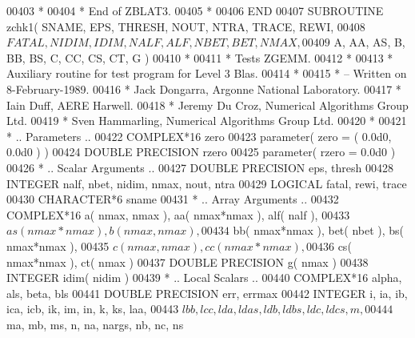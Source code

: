 \begin{DoxyCode}
00403 \textcolor{comment}{*}
00404 \textcolor{comment}{*     End of ZBLAT3.}
00405 \textcolor{comment}{*}
00406 \textcolor{keyword}{      END}
00407 \textcolor{keyword}{      SUBROUTINE }zchk1( SNAME, EPS, THRESH, NOUT, NTRA, TRACE, REWI,
00408      $                  FATAL, NIDIM, IDIM, NALF, ALF, NBET, BET, NMAX,
00409      $                  A, AA, AS, B, BB, BS, C, CC, CS, CT, G )
00410 \textcolor{comment}{*}
00411 \textcolor{comment}{*  Tests ZGEMM.}
00412 \textcolor{comment}{*}
00413 \textcolor{comment}{*  Auxiliary routine for test program for Level 3 Blas.}
00414 \textcolor{comment}{*}
00415 \textcolor{comment}{*  -- Written on 8-February-1989.}
00416 \textcolor{comment}{*     Jack Dongarra, Argonne National Laboratory.}
00417 \textcolor{comment}{*     Iain Duff, AERE Harwell.}
00418 \textcolor{comment}{*     Jeremy Du Croz, Numerical Algorithms Group Ltd.}
00419 \textcolor{comment}{*     Sven Hammarling, Numerical Algorithms Group Ltd.}
00420 \textcolor{comment}{*}
00421 \textcolor{comment}{*     .. Parameters ..}
00422       \textcolor{keywordtype}{COMPLEX*16}         zero
00423       parameter( zero = ( 0.0d0, 0.0d0 ) )
00424       \textcolor{keywordtype}{DOUBLE PRECISION}   rzero
00425       parameter( rzero = 0.0d0 )
00426 \textcolor{comment}{*     .. Scalar Arguments ..}
00427       \textcolor{keywordtype}{DOUBLE PRECISION}   eps, thresh
00428       \textcolor{keywordtype}{INTEGER}            nalf, nbet, nidim, nmax, nout, ntra
00429       \textcolor{keywordtype}{LOGICAL}            fatal, rewi, trace
00430       \textcolor{keywordtype}{CHARACTER*6}        sname
00431 \textcolor{comment}{*     .. Array Arguments ..}
00432       \textcolor{keywordtype}{COMPLEX*16}         a( nmax, nmax ), aa( nmax*nmax ), alf( nalf ),
00433      $                   as( nmax*nmax ), b( nmax, nmax ),
00434      $                   bb( nmax*nmax ), bet( nbet ), bs( nmax*nmax ),
00435      $                   c( nmax, nmax ), cc( nmax*nmax ),
00436      $                   cs( nmax*nmax ), ct( nmax )
00437       \textcolor{keywordtype}{DOUBLE PRECISION}   g( nmax )
00438       \textcolor{keywordtype}{INTEGER}            idim( nidim )
00439 \textcolor{comment}{*     .. Local Scalars ..}
00440       \textcolor{keywordtype}{COMPLEX*16}         alpha, als, beta, bls
00441       \textcolor{keywordtype}{DOUBLE PRECISION}   err, errmax
00442       \textcolor{keywordtype}{INTEGER}            i, ia, ib, ica, icb, ik, im, in, k, ks, laa,
00443      $                   lbb, lcc, lda, ldas, ldb, ldbs, ldc, ldcs, m,
00444      $                   ma, mb, ms, n, na, nargs, nb, nc, ns

\end{DoxyCode}
